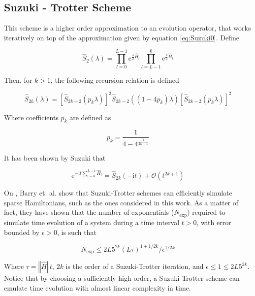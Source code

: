   \subsection{Suzuki - Trotter Scheme}
  This scheme is a higher order approximation to an evolution operator, that works iteratively on top of the approximation given by equation \ref{eq:Suzuki0}. Define \cite{SuzukiFormula, BerryErrorBounds}

  \begin{equation}
    \hat{S}_2(\lambda) = \prod_{l = 0}^{L-1} \mathrm{e}^{\frac{\lambda}{2}\hat{H}_l} \prod_{l = L-1}^{0} \mathrm{e}^{\frac{\lambda}{2}\hat{H}_l}
    \label{eq:SuzukiInit}
  \end{equation}

  Then, for $k > 1$, the following recursion relation is defined

  \begin{equation}
    \hat{S}_{2k}(\lambda) = [\hat{S}_{2k-2}(p_k\lambda)]^2 \hat{S}_{2k-2}((1 - 4 p_k)\lambda) [\hat{S}_{2k-2}(p_k\lambda)]^2
    \label{eq:SuzukiRecursion}
  \end{equation}

  Where coefficients $p_k$ are defined as

  \begin{equation}
    p_k = \frac{1}{4 - 4^{\frac{1}{2k-1}}}
    \label{eq:pk}
  \end{equation}

  It has been shown by Suzuki that \cite{SuzukiFormula}

  \begin{equation}
    \mathrm{e}^{-\mathrm{i}t \sum_{l = 0}^{L-1} \hat{H}_l} = \hat{S}_{2k}(-\mathrm{i}t) + \mathcal{O}(t^{2k+1})
  \end{equation}

  On \cite{BerryErrorBounds}, Barry et. al. show that Suzuki-Trotter schemes can efficiently simulate sparse Hamiltonians, such as the ones considered in this work. As a matter of fact, they have shown that the number of exponentials ($N_{\text{exp}}$) required to simulate time evolution of a system during a time interval $t > 0$, with error bounded by $\epsilon > 0$, is such that

  \begin{equation}
    N_{\text{exp}} \leq 2L5^{2k}(L\tau)^{1+1/2k}/\epsilon^{1/2k}
  \end{equation}

  Where $\tau = \left\Vert \hat{H} \right\Vert t$, $2k$ is the order of a Suzuki-Trotter iteration, and $\epsilon \leq 1 \leq 2L5^{2k}$. Notice that by choosing a sufficiently high order, a Suzuki-Trotter scheme can emulate time evolution with almost linear complexity in time.


